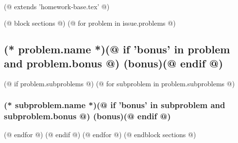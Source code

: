 (@ extends 'homework-base.tex' @)

(@ block sections @)
    (@ for problem in issue.problems @)
        \subsection{(* problem.name *)(@ if 'bonus' in problem and problem.bonus @) (bonus)(@ endif @)}
        (@ if problem.subproblems @)
            (@ for subproblem in problem.subproblems @)
                \subsubsection{(* subproblem.name *)(@ if 'bonus' in subproblem and subproblem.bonus @) (bonus)(@ endif @)}
            (@ endfor @)
        (@ endif @)
    (@ endfor @)
(@ endblock sections @)
